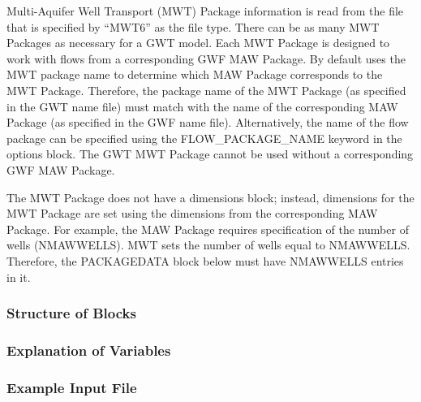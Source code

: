 Multi-Aquifer Well Transport (MWT) Package information is read from the file that is specified by ``MWT6'' as the file type.  There can be as many MWT Packages as necessary for a GWT model. Each MWT Package is designed to work with flows from a corresponding GWF MAW Package. By default \mf uses the MWT package name to determine which MAW Package corresponds to the MWT Package.  Therefore, the package name of the MWT Package (as specified in the GWT name file) must match with the name of the corresponding MAW Package (as specified in the GWF name file).  Alternatively, the name of the flow package can be specified using the FLOW\_PACKAGE\_NAME keyword in the options block.  The GWT MWT Package cannot be used without a corresponding GWF MAW Package.

The MWT Package does not have a dimensions block; instead, dimensions for the MWT Package are set using the dimensions from the corresponding MAW Package.  For example, the MAW Package requires specification of the number of wells (NMAWWELLS).  MWT sets the number of wells equal to NMAWWELLS.  Therefore, the PACKAGEDATA block below must have NMAWWELLS entries in it.

\vspace{5mm}
\subsubsection{Structure of Blocks}




\vspace{5mm}
\subsubsection{Explanation of Variables}
\begin{description}

\end{description}

\vspace{5mm}
\subsubsection{Example Input File}


\vspace{5mm}
